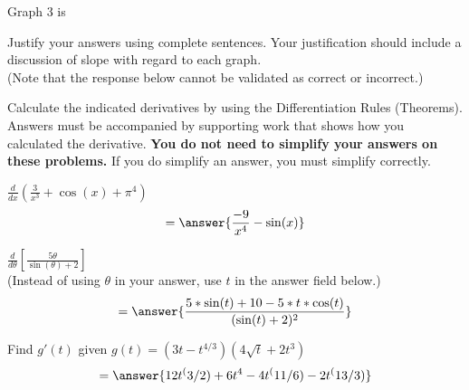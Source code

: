 \documentclass[handout]{ximera}
\begin{document}
\begin{problem}
\begin{question}
Graph 3 is
\begin{multipleChoice}
\end{multipleChoice}
\end{question}


Justify your answers using complete sentences. Your justification should include a discussion of slope with regard to each graph. \\  (Note that the response below cannot be validated as correct or incorrect.)
\begin{freeResponse}
\end{freeResponse}
\end{problem}

\medskip
\begin{problem}
Calculate the indicated derivatives by using the Differentiation Rules (Theorems). Answers must be accompanied by supporting work that shows how you calculated the derivative. \textbf{You do not need to simplify your answers on these problems.} If you do simplify an answer, you must simplify correctly. 

\begin{question}
$\displaystyle \frac{d}{dx}\left(\frac{3}{x^3}+\cos(x)+\pi^4\right)$
\[
= \answer{\dfrac{-9}{x^4} - \sin(x)}
\]

\end{question}

\begin{question}
$\displaystyle \frac{d}{d\theta}\left[\frac{5\theta}{\sin(\theta)+2}\right]$ \\
(Instead of using $\theta$ in your answer, use $t$ in the answer field below.)\\
\[
= \answer{\dfrac{5*\sin(t) + 10 - 5*t*\cos(t)}{(\sin(t) + 2)^2}}
\]
\end{question}


\begin{question}
Find $g'(t)$ given $\displaystyle g(t)=(3t-t^{4/3})(4\sqrt{t}+2t^3)$
\[
= \answer{12t^(3/2) + 6t^4 - 4t^(11/6) - 2t^(13/3)}
\]
\end{question}
\end{problem}
\end{document}

